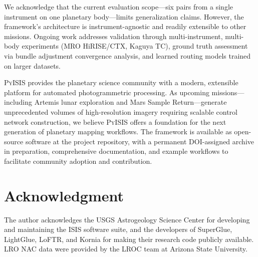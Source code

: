 \documentclass[lettersize,journal]{IEEEtran}
\newcommand{\pyisis}{\textsc{PyISIS}}
\begin{document}
We acknowledge that the current evaluation scope---six pairs from a single instrument on one planetary body---limits generalization claims. However, the framework's architecture is instrument-agnostic and readily extensible to other missions. Ongoing work addresses validation through multi-instrument, multi-body experiments (MRO HiRISE/CTX, Kaguya TC), ground truth assessment via bundle adjustment convergence analysis, and learned routing models trained on larger datasets.

\pyisis{} provides the planetary science community with a modern, extensible platform for automated photogrammetric processing. As upcoming missions---including Artemis lunar exploration and Mars Sample Return---generate unprecedented volumes of high-resolution imagery requiring scalable control network construction, we believe \pyisis{} offers a foundation for the next generation of planetary mapping workflows. The framework is available as open-source software at the project repository, with a permanent DOI-assigned archive in preparation, comprehensive documentation, and example workflows to facilitate community adoption and contribution.


\section*{Acknowledgment}

The author acknowledges the USGS Astrogeology Science Center for developing and maintaining the ISIS software suite, and the developers of SuperGlue, LightGlue, LoFTR, and Kornia for making their research code publicly available. LRO NAC data were provided by the LROC team at Arizona State University.




\end{document}
